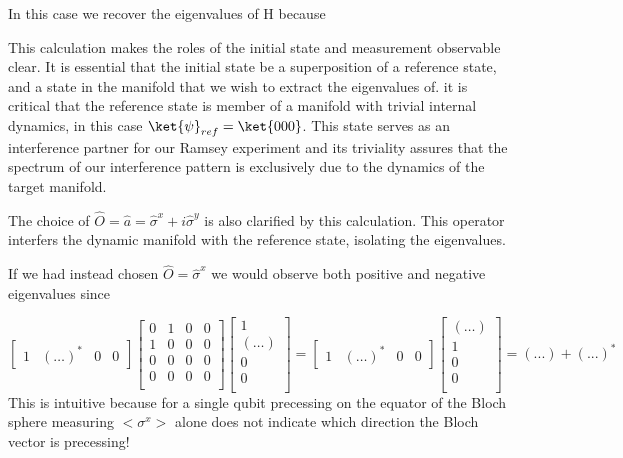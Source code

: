 In this case we recover the eigenvalues of H because 

This calculation makes the roles of the initial state and measurement observable clear.
It is essential that the initial state be a superposition of a reference state, and a state in the manifold that we wish to extract the eigenvalues of.
it is critical that the reference state is member of a manifold with trivial internal dynamics, in this case $\ket{\psi}_{ref} = \ket{000}$.
This state serves as an interference partner for our Ramsey experiment and its triviality assures that the spectrum of our interference pattern is exclusively due to the dynamics of the target manifold.

The choice of $\hat{O} = \hat{a} = \hat{\sigma}^x + i \hat{\sigma}^y$ is also clarified by this calculation.
This operator interfers the dynamic manifold with the reference state, isolating the eigenvalues.

If we had instead chosen  $\hat{O} = \hat{\sigma}^x$ we would observe both positive and negative eigenvalues since

\begin{equation}
    \begin{bmatrix}
        1 & (\ldots)^* & 0 & 0
    \end{bmatrix}
    \begin{bmatrix}
        0 & 1 & 0 & 0 \\
        1 & 0 & 0 & 0 \\
        0 & 0 & 0 & 0 \\
        0 & 0 & 0 & 0 \\
    \end{bmatrix}
    \begin{bmatrix}
        1 \\
        (\ldots) \\
        0 \\
        0 \\
    \end{bmatrix}
    =
    \begin{bmatrix}
        1 & (\ldots)^* & 0 & 0
    \end{bmatrix}
    \begin{bmatrix}
        (\ldots) \\
        1 \\
        0 \\
        0 \\
    \end{bmatrix}
    = (...) + (...)^*
\end{equation}
This is intuitive because for a single qubit precessing on the equator of the Bloch sphere measuring $<\sigma^x>$ alone does not indicate which direction the Bloch vector is precessing!

